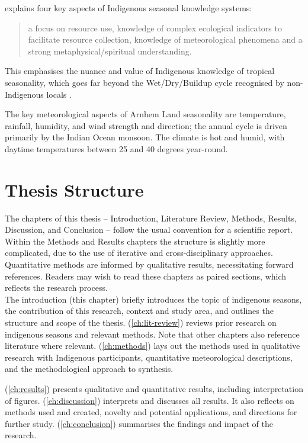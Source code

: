 \citet{woodward2012b} explains four key aspects of Indigenous seasonal
knowledge systems: \blockquote{a focus on resource use, knowledge of complex
    ecological indicators to facilitate resource collection, knowledge of
    meteorological phenomena and a strong metaphysical/spiritual understanding.}.
This emphasises the nuance and value of Indigenous knowledge of tropical
seasonality, which goes far beyond the Wet/Dry/Buildup cycle recognised
by non-Indigenous locals \citep{willmett2009}.

The key meteorological aspects of Arnhem Land seasonality are temperature,
rainfall, humidity, and wind strength and direction; the annual
cycle is driven primarily by the Indian Ocean monsoon.  The climate is hot and
humid, with daytime temperatures between 25 and 40 degrees year-round.



\section{Thesis Structure}

The chapters of this thesis -- Introduction, Literature Review, Methods,
Results, Discussion, and Conclusion -- follow the usual convention for
a scientific report.  Within the Methods and Results chapters
the structure is slightly more complicated, due to the use of iterative and
cross-disciplinary approaches.  Quantitative methods are informed by
qualitative results, necessitating forward references.  Readers may wish
to read these chapters as paired sections, which reflects the research
process.\\


The introduction (this chapter) briefly introduces the topic of
indigenous seasons, the contribution of this research, context and
study area, and outlines the structure and scope of the thesis.
%
 (\cref{ch:lit-review}) reviews prior research
on indigenous seasons and relevant methods.  Note that other chapters
also reference literature where relevant.
%
 (\cref{ch:methods}) lays out the methods used in
qualitative research with Indigenous participants, quantitative meteorological
descriptions, and the methodological approach to synthesis.

 (\cref{ch:results}) presents qualitative and
quantitative results, including interpretation of figures.
%
 (\cref{ch:discussion}) interprets and discusses
all results.  It also reflects on methods used and created, novelty and
potential applications, and directions for further study.
%
 (\cref{ch:conclusion}) summarises the findings
and impact of the research.

